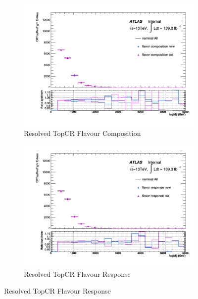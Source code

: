 \begin{figure}[ht]
    \centering
    \begin{subfigure}[b]{0.4\textwidth}
        \centering
        \includegraphics[width=\textwidth]{figures/1lep/FlavorVar/SystFCompCRTopResTight_All_tagMjj.png}
        \caption{Resolved TopCR Flavour Composition}
        \label{fig:ResolvedTopCRFlavourComposition}
    \end{subfigure}
    \quad %
    \begin{subfigure}[b]{0.4\textwidth}
        \centering
        \includegraphics[width=\textwidth]{figures/1lep/FlavorVar/SystFResCRTopResTight_All_tagMjj.png}
        \caption{Resolved TopCR Flavour Response}
        \label{fig:ResolvedTopCRFlavourResponse}
    \end{subfigure}


\end{figure}
